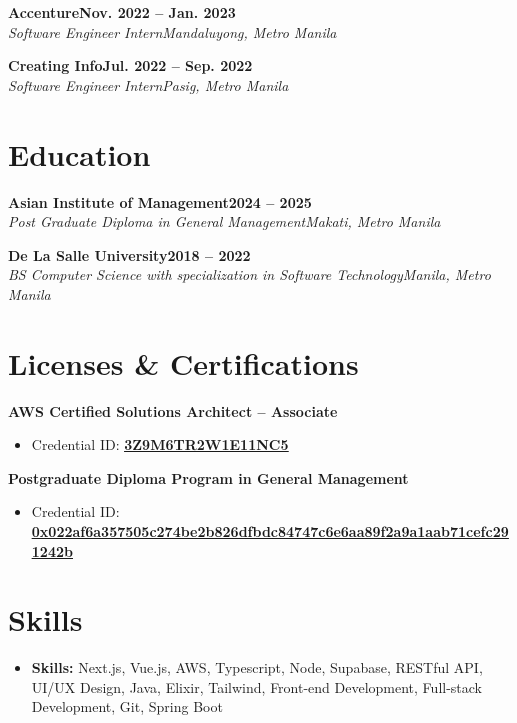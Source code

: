 \documentclass[letterpaper,11pt]{article}
\newcommand{\cvlink}[2]{\href{#1}{\textcolor{linkblue}{\uline{\textbf{#2}}}}}
\newcommand{\entry}[4]{%
  \textbf{#1}\hfill\textbf{#2}\\
  \textit{#3}\hfill\textit{#4}\par
}
\newcommand{\entrygap}{\vspace{10pt}}
\begin{document}
\entry{Accenture}{Nov. 2022 -- Jan. 2023}{Software Engineer Intern}{Mandaluyong, Metro Manila}
\entrygap

\entry{Creating Info}{Jul. 2022 -- Sep. 2022}{Software Engineer Intern}{Pasig, Metro Manila}

\section{Education}

\entry{Asian Institute of Management}{2024 -- 2025}{Post Graduate Diploma in General Management}{Makati, Metro Manila}
\entry{De La Salle University}{2018 -- 2022}{BS Computer Science with specialization in Software Technology}{Manila, Metro Manila}

\section{Licenses \& Certifications}

\textbf{AWS Certified Solutions Architect -- Associate}
\begin{itemize}
  \item Credential ID: \cvlink{https://www.credly.com/badges/af580dd5-d095-4ca6-b142-fa5e9a889263/linked_in_profile}{3Z9M6TR2W1E11NC5}
\end{itemize}
\entrygap

\textbf{Postgraduate Diploma Program in General Management}
\begin{itemize}
  \item Credential ID: \cvlink{https://certificates.emeritus.org/30173107-6b47-49c2-bdd9-ed4a6d2dcc0d}{\small 0x022af6a357505c274be2b826dfbdc84747c6e6aa89f2a9a1aab71cefc291242b}
\end{itemize}

\section{Skills}

\begin{itemize}
  \item \textbf{Skills:} Next.js, Vue.js, AWS, Typescript, Node, Supabase, RESTful API, UI/UX Design, Java, Elixir, Tailwind, Front-end Development, Full-stack Development, Git, Spring Boot
\end{itemize}
\end{document}
